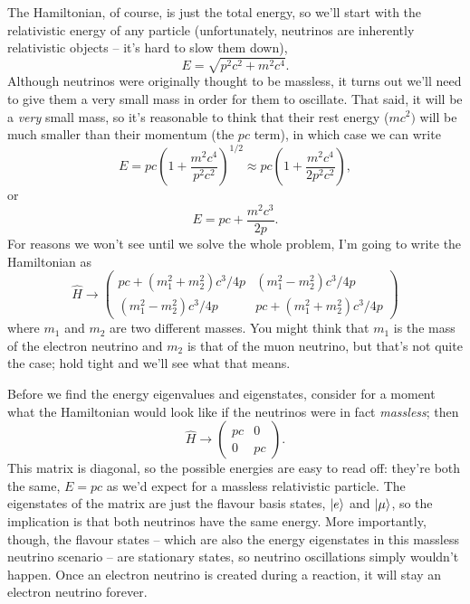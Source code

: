 The Hamiltonian, of course, is just the total energy, so we'll start with the relativistic energy of any particle (unfortunately, neutrinos are inherently relativistic objects -- it's hard to slow them down), 
\[
E = \sqrt{p^2c^2 + m^2 c^4}.
\]
Although neutrinos were originally thought to be massless, it turns out we'll need to give them a very small mass in order for them to oscillate.  That said, it will be a \emph{very} small mass, so it's reasonable to think that their rest energy ($mc^2)$ will be much smaller than their momentum (the $pc$ term), in which case we can write 
\[
E = pc \left( 1 + \frac{m^2c^4}{p^2c^2} \right)^{1/2} \approx pc \left( 1 + \frac{m^2c^4}{2p^2c^2} \right),
\]
or
\begin{equation}
\label{eq_relE}
E = pc + \frac{m^2c^3}{2p}.
\end{equation}
For reasons we won't see until we solve the whole problem, I'm going to write the Hamiltonian as
\begin{equation}
\hat{H} \to \begin{pmatrix}
pc + (m_1^2 + m_2^2) c^3/4p & (m_1^2 - m_2^2)c^3/4p \\
(m_1^2 - m_2^2)c^3/4p &pc + (m_1^2 + m_2^2) c^3/4p 
\end{pmatrix}
\end{equation}
where $m_1$ and $m_2$ are two different masses.  You might think that $m_1$ is the mass of the electron neutrino and $m_2$ is that of the muon neutrino, but that's not quite the case; hold tight and we'll see what that means.

Before we find the energy eigenvalues and eigenstates, consider for a moment what the Hamiltonian would look like if the neutrinos were in fact \emph{massless}; then
\[
\hat{H} \to \begin{pmatrix}
pc & 0 \\
0 & pc 
\end{pmatrix}.
\]
This matrix is diagonal, so the possible energies are easy to read off: they're both the same, $E = pc$ as we'd expect for a massless relativistic particle.  The eigenstates of the matrix are just the flavour basis states, $| e \rangle$ and $| \mu \rangle$, so the implication is that both neutrinos have the same energy.  More importantly, though, the flavour states -- which are also the energy eigenstates in this massless neutrino scenario -- are stationary states, so neutrino oscillations simply wouldn't happen.  Once an electron neutrino is created during a reaction, it will stay an electron neutrino forever.  

